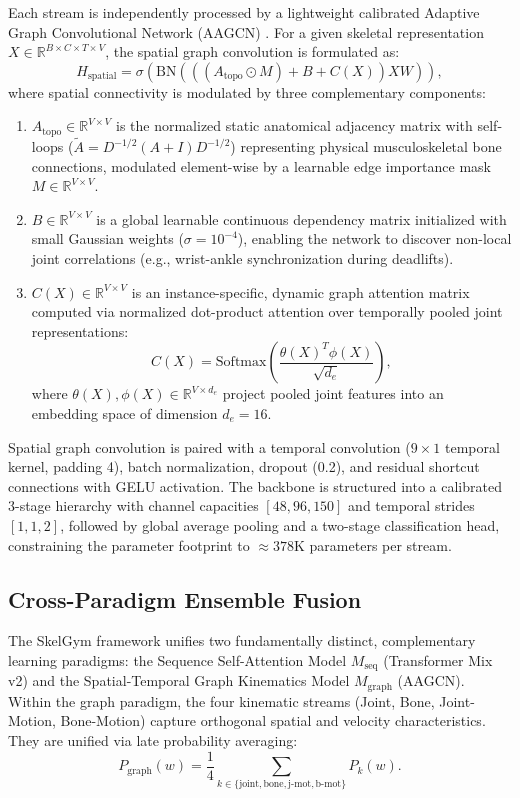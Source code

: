 \documentclass[preprint,12pt]{elsarticle}
\begin{document}
Each stream is independently processed by a lightweight calibrated Adaptive Graph Convolutional Network (AAGCN) \cite{shi2020skeleton}. For a given skeletal representation $X \in \mathbb{R}^{B \times C \times T \times V}$, the spatial graph convolution is formulated as:
\begin{equation}
    H_{\text{spatial}} = \sigma\left( \mathrm{BN}\left( \left( (A_{\text{topo}} \odot M) + B + C(X) \right) X W \right) \right),
\end{equation}
where spatial connectivity is modulated by three complementary components:
\begin{enumerate}
    \item $A_{\text{topo}} \in \mathbb{R}^{V \times V}$ is the normalized static anatomical adjacency matrix with self-loops ($\tilde{A} = D^{-1/2}(A + I)D^{-1/2}$) representing physical musculoskeletal bone connections, modulated element-wise by a learnable edge importance mask $M \in \mathbb{R}^{V \times V}$.
    \item $B \in \mathbb{R}^{V \times V}$ is a global learnable continuous dependency matrix initialized with small Gaussian weights ($\sigma = 10^{-4}$), enabling the network to discover non-local joint correlations (e.g., wrist-ankle synchronization during deadlifts).
    \item $C(X) \in \mathbb{R}^{V \times V}$ is an instance-specific, dynamic graph attention matrix computed via normalized dot-product attention over temporally pooled joint representations:
    \begin{equation}
        C(X) = \mathrm{Softmax}\left( \frac{\theta(X)^T \phi(X)}{\sqrt{d_e}} \right),
    \end{equation}
    where $\theta(X), \phi(X) \in \mathbb{R}^{V \times d_e}$ project pooled joint features into an embedding space of dimension $d_e = 16$.
\end{enumerate}
Spatial graph convolution is paired with a temporal convolution ($9 \times 1$ temporal kernel, padding 4), batch normalization, dropout (0.2), and residual shortcut connections with GELU activation. The backbone is structured into a calibrated 3-stage hierarchy with channel capacities $[48, 96, 150]$ and temporal strides $[1, 1, 2]$, followed by global average pooling and a two-stage classification head, constraining the parameter footprint to $\approx 378\text{K}$ parameters per stream.

\subsection{Cross-Paradigm Ensemble Fusion}
The SkelGym framework unifies two fundamentally distinct, complementary learning paradigms: the Sequence Self-Attention Model $M_{\text{seq}}$ (Transformer Mix v2) and the Spatial-Temporal Graph Kinematics Model $M_{\text{graph}}$ (AAGCN). Within the graph paradigm, the four kinematic streams (Joint, Bone, Joint-Motion, Bone-Motion) capture orthogonal spatial and velocity characteristics. They are unified via late probability averaging:
\begin{equation}
    P_{\text{graph}}(w) = \frac{1}{4} \sum_{k \in \{\text{joint}, \text{bone}, \text{j-mot}, \text{b-mot}\}} P_k(w).
\end{equation}
\end{document}
